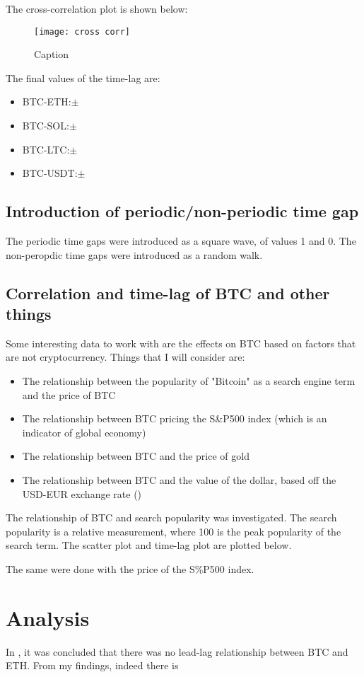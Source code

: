 \documentclass[a4paper, 10pt, conference]{ieeeconf}      %
\begin{document}
The cross-correlation plot is shown below:
\begin{figure}
    \centering
    \texttt{[image: cross corr]}
    \caption{Caption}
    \label{fig:enter-label}
\end{figure}
The final values of the time-lag are:
\begin{itemize}
    \item BTC-ETH:$\pm$
    \item BTC-SOL:$\pm$
    \item BTC-LTC:$\pm$
    \item BTC-USDT:$\pm$
\end{itemize}

\subsection{Introduction of periodic/non-periodic time gap}
The periodic time gaps were introduced as a square wave, of values 1 and 0.
The non-peropdic time gaps were introduced as a random walk.

\subsection{Correlation and time-lag of BTC and other things}
Some interesting data to work with are the effects on BTC based on factors that are not cryptocurrency. Things that I will consider are:
\begin{itemize}
    \item The relationship between the popularity of "Bitcoin" as a search engine term and the price of BTC
    \item The relationship between BTC pricing the S\&P500 index (which is an indicator of global economy)
    \item The relationship between BTC and the price of gold
    \item The relationship between BTC and the value of the dollar, based off the USD-EUR exchange rate (\cite{Georgoula2015})
\end{itemize}

The relationship of BTC and search popularity was investigated. The search popularity is a relative measurement, where 100 is the peak popularity of the search term. The scatter plot and time-lag plot are plotted below.

The same were done with the price of the S\%P500 index.



\section{Analysis}
In \cite{Sifat2019}, it was concluded that there was no lead-lag relationship between BTC and ETH. From my findings, indeed there is
\end{document}
